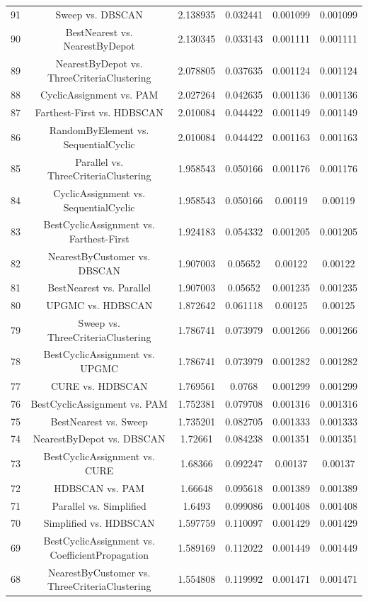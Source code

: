 \documentclass[a4paper,10pt]{article}
\begin{document}
\begin{landscape}
\begin{table}[!htp]
\begin{tabular}{cccccc}
91&Sweep vs. DBSCAN&2.138935&0.032441&0.001099&0.001099\\
90&BestNearest vs. NearestByDepot&2.130345&0.033143&0.001111&0.001111\\
89&NearestByDepot vs. ThreeCriteriaClustering&2.078805&0.037635&0.001124&0.001124\\
88&CyclicAssignment vs. PAM&2.027264&0.042635&0.001136&0.001136\\
87&Farthest-First vs. HDBSCAN&2.010084&0.044422&0.001149&0.001149\\
86&RandomByElement vs. SequentialCyclic&2.010084&0.044422&0.001163&0.001163\\
85&Parallel vs. ThreeCriteriaClustering&1.958543&0.050166&0.001176&0.001176\\
84&CyclicAssignment vs. SequentialCyclic&1.958543&0.050166&0.00119&0.00119\\
83&BestCyclicAssignment vs. Farthest-First&1.924183&0.054332&0.001205&0.001205\\
82&NearestByCustomer vs. DBSCAN&1.907003&0.05652&0.00122&0.00122\\
81&BestNearest vs. Parallel&1.907003&0.05652&0.001235&0.001235\\
80&UPGMC vs. HDBSCAN&1.872642&0.061118&0.00125&0.00125\\
79&Sweep vs. ThreeCriteriaClustering&1.786741&0.073979&0.001266&0.001266\\
78&BestCyclicAssignment vs. UPGMC&1.786741&0.073979&0.001282&0.001282\\
77&CURE vs. HDBSCAN&1.769561&0.0768&0.001299&0.001299\\
76&BestCyclicAssignment vs. PAM&1.752381&0.079708&0.001316&0.001316\\
75&BestNearest vs. Sweep&1.735201&0.082705&0.001333&0.001333\\
74&NearestByDepot vs. DBSCAN&1.72661&0.084238&0.001351&0.001351\\
73&BestCyclicAssignment vs. CURE&1.68366&0.092247&0.00137&0.00137\\
72&HDBSCAN vs. PAM&1.66648&0.095618&0.001389&0.001389\\
71&Parallel vs. Simplified&1.6493&0.099086&0.001408&0.001408\\
70&Simplified vs. HDBSCAN&1.597759&0.110097&0.001429&0.001429\\
69&BestCyclicAssignment vs. CoefficientPropagation&1.589169&0.112022&0.001449&0.001449\\
68&NearestByCustomer vs. ThreeCriteriaClustering&1.554808&0.119992&0.001471&0.001471\\

\end{tabular}
\end{table}
\end{landscape}
\end{document}
